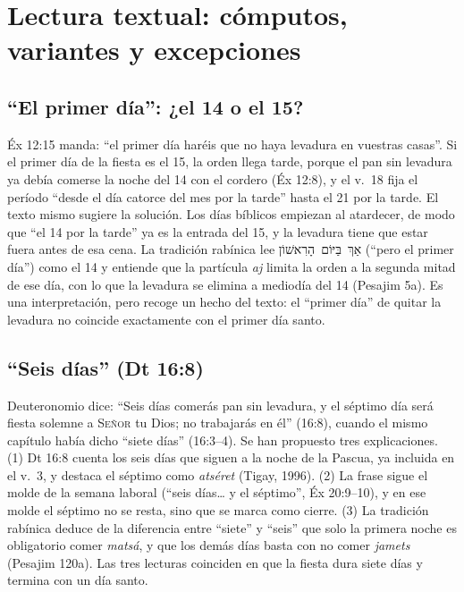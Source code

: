\documentclass[11pt,letterpaper]{article}
\newcommand{\heb}[1]{\mbox{\foreignlanguage{hebrew}{#1}}}
\newcommand{\SENOR}{\textsc{Señor}}
\begin{document}
\section{Lectura textual: cómputos, variantes y excepciones}\label{sec:textual}

\subsection{``El primer día'': ¿el 14 o el 15?}
Éx 12:15 manda: ``el primer día haréis que no haya levadura en vuestras casas''. Si el primer día de la fiesta es el 15, la orden llega tarde, porque el pan sin levadura ya debía comerse la noche del 14 con el cordero (Éx 12:8), y el v.~18 fija el período ``desde el día catorce del mes por la tarde'' hasta el 21 por la tarde. El texto mismo sugiere la solución. Los días bíblicos empiezan al atardecer, de modo que ``el 14 por la tarde'' ya es la entrada del 15, y la levadura tiene que estar fuera antes de esa cena. La tradición rabínica lee \heb{אַךְ בַּיּוֹם הָרִאשׁוֹן} (``pero el primer día'') como el 14 y entiende que la partícula \emph{aj} limita la orden a la segunda mitad de ese día, con lo que la levadura se elimina a mediodía del 14 (Pesajim 5a). Es una interpretación, pero recoge un hecho del texto: el ``primer día'' de quitar la levadura no coincide exactamente con el primer día santo.

\subsection{``Seis días'' (Dt 16:8)}
Deuteronomio dice: ``Seis días comerás pan sin levadura, y el séptimo día será fiesta solemne a \SENOR{} tu Dios; no trabajarás en él'' (16:8), cuando el mismo capítulo había dicho ``siete días'' (16:3--4). Se han propuesto tres explicaciones. (1) Dt 16:8 cuenta los seis días que siguen a la noche de la Pascua, ya incluida en el v.~3, y destaca el séptimo como \emph{atséret} (Tigay, 1996). (2) La frase sigue el molde de la semana laboral (``seis días\ldots{} y el séptimo'', Éx 20:9--10), y en ese molde el séptimo no se resta, sino que se marca como cierre. (3) La tradición rabínica deduce de la diferencia entre ``siete'' y ``seis'' que solo la primera noche es obligatorio comer \emph{matsá}, y que los demás días basta con no comer \emph{jamets} (Pesajim 120a). Las tres lecturas coinciden en que la fiesta dura siete días y termina con un día santo.
\end{document}
